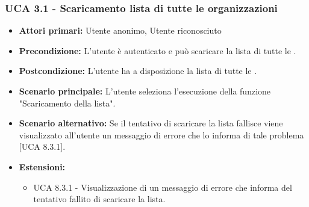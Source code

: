 \subsubsection{UCA 3.1 - Scaricamento lista di tutte le organizzazioni}%
\begin{itemize}
\item \textbf{Attori primari:} Utente anonimo, Utente riconosciuto
\item \textbf{Precondizione:} L'utente è autenticato e può scaricare la lista di tutte le .
\item \textbf{Postcondizione:} L'utente ha a disposizione la lista di tutte le .
\item \textbf{Scenario principale:} L'utente seleziona l'esecuzione della funzione "Scaricamento della lista".
\item \textbf{Scenario alternativo:} Se il tentativo di scaricare la lista fallisce viene visualizzato all'utente un messaggio di errore che lo informa di tale problema [UCA 8.3.1].
\item \textbf{Estensioni:}
	\begin{itemize}
	\item UCA 8.3.1 - Visualizzazione di un messaggio di errore che informa del tentativo fallito di scaricare la lista.
\end{itemize}
  
\end{itemize}

